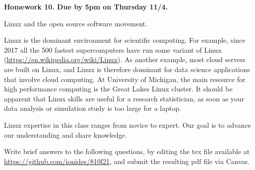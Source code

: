 \documentclass[12pt]{article}
\begin{document}
\begin{center}\bf
Homework 10. Due by 5pm on Thursday 11/4.

Linux and the open source software movement.

\end{center}

Linux is the dominant environment for scientific computing. For example, since 2017 all the 500 fastest  supercomputers have run some variant of Linux (\url{https://en.wikipedia.org/wiki/Linux}). As another example, most cloud servers are built on Linux, and Linux is therefore dominant for data science applications that involve cloud computing. At University of Michigan, the main resource for high performance computing is the Great Lakes Linux cluster. It should be apparent that Linux skills are useful for a research statistician, as soon as your data analysis or simulation study is too large for a laptop.

Linux expertise in this class ranges from novice to expert. Our goal is to advance our understanding and share knowledge.

Write brief answers to the following questions, by editing the tex file available at \url{https://github.com/ionides/810f21}, and submit the resulting pdf file via Canvas.
\end{document}
